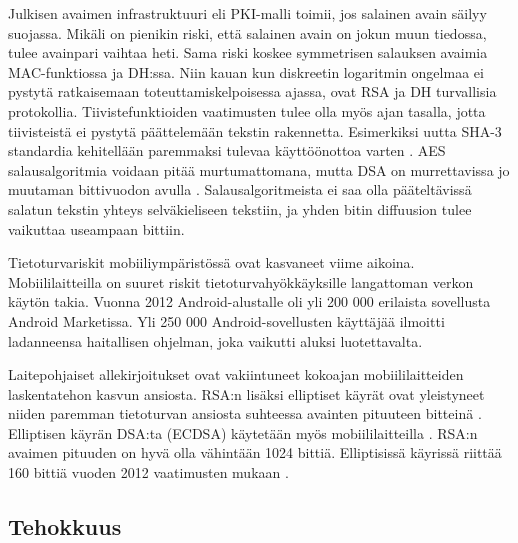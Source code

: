 \documentclass[finnish]{tktltiki2}
\theoremstyle{definition}
\theoremstyle{remark}
\begin{document}
Julkisen avaimen infrastruktuuri eli PKI-malli toimii, jos salainen avain säilyy suojassa. Mikäli on pienikin riski, että salainen avain on jokun muun tiedossa, tulee avainpari vaihtaa heti. Sama riski koskee symmetrisen salauksen avaimia MAC-funktiossa ja DH:ssa. Niin kauan kun diskreetin logaritmin ongelmaa ei pystytä ratkaisemaan toteuttamiskelpoisessa ajassa, ovat RSA ja DH turvallisia protokollia. Tiivistefunktioiden vaatimusten tulee olla myös ajan tasalla, jotta tiivisteistä ei pystytä päättelemään tekstin rakennetta. Esimerkiksi uutta SHA-3 standardia kehitellään paremmaksi tulevaa käyttöönottoa varten \cite{nist}. AES salausalgoritmia voidaan pitää murtumattomana, mutta DSA on murrettavissa jo muutaman bittivuodon avulla \cite{gsm}. Salausalgoritmeista ei saa olla pääteltävissä salatun tekstin yhteys selväkieliseen tekstiin, ja yhden bitin diffuusion tulee vaikuttaa useampaan bittiin.

Tietoturvariskit mobiiliympäristössä ovat kasvaneet viime aikoina. Mobiililaitteilla on suuret riskit tietoturvahyökkäyksille langattoman verkon käytön takia. Vuonna 2012 Android-alustalle oli yli 200 000 erilaista sovellusta Android Marketissa. Yli 250 000 Android-sovellusten käyttäjää ilmoitti ladanneensa haitallisen ohjelman, joka vaikutti aluksi luotettavalta. \cite{enti}

Laitepohjaiset allekirjoitukset ovat vakiintuneet kokoajan mobiililaitteiden laskentatehon kasvun ansiosta. RSA:n lisäksi elliptiset käyrät ovat yleistyneet niiden paremman tietoturvan ansiosta suhteessa avainten pituuteen bitteinä \cite{ECC}. Elliptisen käyrän DSA:ta (ECDSA) käytetään myös mobiililaitteilla \cite{webs}. RSA:n avaimen pituuden on hyvä olla vähintään 1024 bittiä. Elliptisissä käyrissä riittää 160 bittiä vuoden 2012 vaatimusten mukaan \cite{ECC}.   
	  

\subsection{Tehokkuus}
\end{document}
